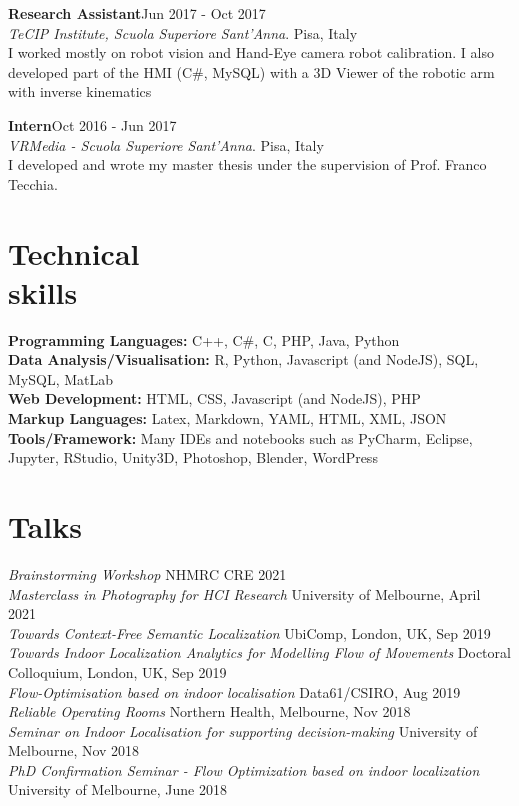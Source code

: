 \documentclass[margin]{res}
\begin{document}
\begin{resume}
\textbf{Research Assistant}\hfill{Jun 2017 - Oct 2017}\\
\textit{TeCIP Institute, Scuola Superiore Sant'Anna}. Pisa, Italy\\
I worked mostly on robot vision and Hand-Eye camera robot calibration. I also developed part of the HMI (C\#, MySQL) with a 3D Viewer of the robotic arm with inverse kinematics


\textbf{Intern}\hfill{Oct 2016 - Jun 2017}\\
\textit{VRMedia - Scuola Superiore Sant'Anna}. Pisa, Italy\\
I developed and wrote my master thesis under the supervision of Prof. Franco Tecchia.


\section{Technical\\skills}

\textbf{Programming Languages:} C++, C\#, C, PHP, Java, Python
\\
\textbf{Data Analysis/Visualisation:} R, Python, Javascript (and NodeJS), SQL, MySQL, MatLab
\\
\textbf{Web Development:} HTML, CSS, Javascript (and NodeJS), PHP
\\
\textbf{Markup Languages:} Latex, Markdown, YAML, HTML, XML, JSON
\\
\textbf{Tools/Framework:} Many IDEs and notebooks such as PyCharm, Eclipse, Jupyter, RStudio, Unity3D, Photoshop, Blender, WordPress


\section{Talks}
\par
\textbullet{} \textit{Brainstorming Workshop} \hfill{NHMRC CRE 2021}\\
\textbullet{} \textit{Masterclass in Photography for HCI Research} \hfill{University of Melbourne, April 2021}\\
\textbullet{} \textit{Towards Context-Free Semantic Localization} \hfill{UbiComp, London, UK, Sep 2019}\\
\textbullet{} \textit{Towards Indoor Localization Analytics for Modelling Flow of Movements} \hfill{\UbiComp Doctoral Colloquium, London, UK, Sep 2019}\\
\textbullet{} \textit{Flow-Optimisation based on indoor localisation} \hfill{Data61/CSIRO, Aug 2019}\\
\textbullet{} \textit{Reliable Operating Rooms} \hfill{Northern Health, Melbourne, Nov 2018}\\
\textbullet{} \textit{Seminar on Indoor Localisation for supporting decision-making} \hfill{University of Melbourne, Nov 2018}\\
\textbullet{} \textit{PhD Confirmation Seminar - Flow Optimization based on indoor localization} \hfill{University of Melbourne, June 2018}\\



\end{resume}
\end{document}
